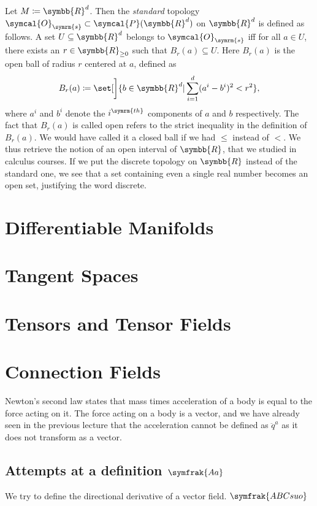 \documentclass[a4 paper, 12pt]{book}
\theoremstyle{definition}
\newcommand{\rr}{\symbb{R}}
\newcommand{\topology}{\symcal{O}}
\newcommand{\powerset}{\symcal{P}}
\newcommand{\ball}{B}
\begin{document}
    Let \(M \coloneq \rr^d\). Then the \textit{standard} topology \(\topology_{\symrm{s}} \subset \powerset(\rr^d)\) on \(\rr^d\) is defined as follows. A set \(U \subseteq \rr^d\) belongs to \(\topology_{\symrm{s}}\) iff for all \(a \in U\), there exists an \(r \in \rr_{\geq 0}\) such that \(\ball_r(a) \subseteq U\). Here \(\ball_r(a)\) is the open ball of radius \(r\) centered at \(a\), defined as 
    \[
        \ball_r(a) \coloneq \set[\bigg]{b \in \rr^d | \sum_{i=1}^d (a^i - b^i)^2 < r^2},
    \] 
    where \(a^i\) and \(b^i\) denote the \(i^{\symrm{th}}\) components of \(a\) and \(b\) respectively. The fact that \(\ball_r(a)\) is called open refers to the strict inequality in the definition of \(\ball_r(a)\). We would have called it a closed ball if we had \(\leq\) instead of \(<\). We thus retrieve the notion of an open interval of \(\rr\), that we studied in calculus courses. If we put the discrete topology on \(\rr\) instead of the standard one, we see that a set containing even a single real number becomes an open set, justifying the word discrete.

    \chapter{Differentiable Manifolds}

    \chapter{Tangent Spaces}

    \chapter{Tensors and Tensor Fields}
    
    \chapter{Connection Fields}

    Newton's second law states that mass times acceleration of a body is equal to the force acting on it. The force acting on a body is a vector, and we have already seen in the previous lecture that the acceleration cannot be defined as \(\ddot q^a\) as it does not transform as a vector.

    \section{Attempts at a definition \texorpdfstring{\(\symfrak{Aa}\)}{PDFstring}}

    We try to define the directional derivative of a vector field. \(\symfrak{ABCsuo}\)
    
    \nocite{*}
    \printbibliography[heading=bibintoc]
\end{document}

